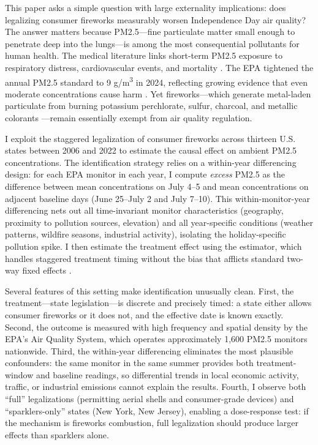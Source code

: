 \documentclass[12pt]{article}
\begin{document}
This paper asks a simple question with large externality implications: does legalizing consumer fireworks measurably worsen Independence Day air quality? The answer matters because PM2.5---fine particulate matter small enough to penetrate deep into the lungs---is among the most consequential pollutants for human health. The medical literature links short-term PM2.5 exposure to respiratory distress, cardiovascular events, and mortality \citep{pope2006health, brunekreef2002air}. The EPA tightened the annual PM2.5 standard to 9 \textmu g/m\textsuperscript{3} in 2024, reflecting growing evidence that even moderate concentrations cause harm \citep{epa2024pm25}. Yet fireworks---which generate metal-laden particulate from burning potassium perchlorate, sulfur, charcoal, and metallic colorants \citep{bishop2023fireworks}---remain essentially exempt from air quality regulation.

I exploit the staggered legalization of consumer fireworks across thirteen U.S. states between 2006 and 2022 to estimate the causal effect on ambient PM2.5 concentrations. The identification strategy relies on a within-year differencing design: for each EPA monitor in each year, I compute \textit{excess} PM2.5 as the difference between mean concentrations on July 4--5 and mean concentrations on adjacent baseline days (June 25--July 2 and July 7--10). This within-monitor-year differencing nets out all time-invariant monitor characteristics (geography, proximity to pollution sources, elevation) and all year-specific conditions (weather patterns, wildfire seasons, industrial activity), isolating the holiday-specific pollution spike. I then estimate the treatment effect using the \citet{callaway2021difference} estimator, which handles staggered treatment timing without the bias that afflicts standard two-way fixed effects \citep{goodman2021difference, roth2023s}.

Several features of this setting make identification unusually clean. First, the treatment---state legislation---is discrete and precisely timed: a state either allows consumer fireworks or it does not, and the effective date is known exactly. Second, the outcome is measured with high frequency and spatial density by the EPA's Air Quality System, which operates approximately 1,600 PM2.5 monitors nationwide. Third, the within-year differencing eliminates the most plausible confounders: the same monitor in the same summer provides both treatment-window and baseline readings, so differential trends in local economic activity, traffic, or industrial emissions cannot explain the results. Fourth, I observe both ``full'' legalizations (permitting aerial shells and consumer-grade devices) and ``sparklers-only'' states (New York, New Jersey), enabling a dose-response test: if the mechanism is fireworks combustion, full legalization should produce larger effects than sparklers alone.
\end{document}
